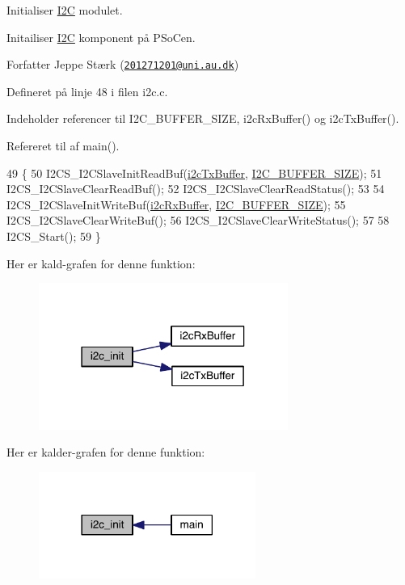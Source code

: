Initialiser \hyperlink{class_i2_c}{I2C} modulet. 

Initailiser \hyperlink{class_i2_c}{I2C} komponent på P\+SoC\textquotesingle{}en.

\begin{DoxyAuthor}{Forfatter}
Jeppe Stærk (\href{mailto:201271201@uni.au.dk}{\tt 201271201@uni.\+au.\+dk}) 
\end{DoxyAuthor}


Defineret på linje 48 i filen i2c.\+c.



Indeholder referencer til I2\+C\+\_\+\+B\+U\+F\+F\+E\+R\+\_\+\+S\+I\+ZE, i2c\+Rx\+Buffer() og i2c\+Tx\+Buffer().



Refereret til af main().


\begin{DoxyCode}
49 \{
50   I2CS\_I2CSlaveInitReadBuf(\hyperlink{class_i2_c_a58ba88cddd7843f12a40a87c998f00da}{i2cTxBuffer}, \hyperlink{i2c_8h_a6458dbf193a0eef0470fc1b08400bfcd}{I2C\_BUFFER\_SIZE});
51   I2CS\_I2CSlaveClearReadBuf();
52   I2CS\_I2CSlaveClearReadStatus();
53   
54   I2CS\_I2CSlaveInitWriteBuf(\hyperlink{class_i2_c_a711782550427eea544dabe5394d79a9b}{i2cRxBuffer}, \hyperlink{i2c_8h_a6458dbf193a0eef0470fc1b08400bfcd}{I2C\_BUFFER\_SIZE});
55   I2CS\_I2CSlaveClearWriteBuf();
56   I2CS\_I2CSlaveClearWriteStatus();
57   
58   I2CS\_Start();
59 \}
\end{DoxyCode}


Her er kald-\/grafen for denne funktion\+:\nopagebreak
\begin{figure}[H]
\begin{center}
\leavevmode
\includegraphics[width=231pt]{d4/d47/class_i2_c_a64303230bf4843297e7ac37ac236ca04_cgraph}
\end{center}
\end{figure}




Her er kalder-\/grafen for denne funktion\+:\nopagebreak
\begin{figure}[H]
\begin{center}
\leavevmode
\includegraphics[width=201pt]{d4/d47/class_i2_c_a64303230bf4843297e7ac37ac236ca04_icgraph}
\end{center}
\end{figure}


